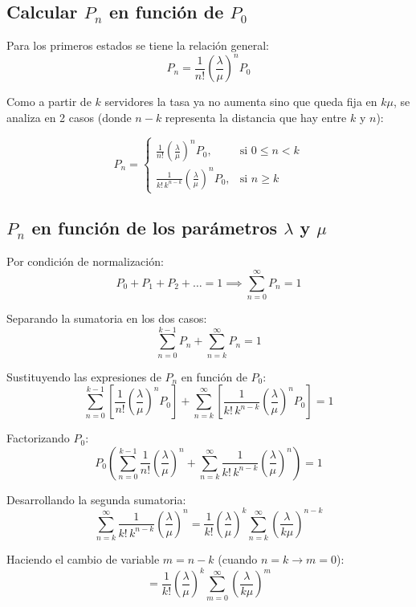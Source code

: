 \documentclass[11pt, a4paper]{article}
\begin{document}
\subsection[Calcular Pn en función de P0]{Calcular $P_n$ en función de $P_0$}

Para los primeros estados se tiene la relación general:
\[
P_n = \frac{1}{n!} \left( \frac{\lambda}{\mu} \right)^n P_0
\]

Como a partir de $k$ servidores la tasa ya no aumenta sino que queda fija en $k\mu$, se analiza en 2 casos (donde $n-k$ representa la distancia que hay entre $k$ y $n$):

\[
P_n = 
\begin{cases} 
\displaystyle \frac{1}{n!} \left( \frac{\lambda}{\mu} \right)^n P_0, & \text{si } 0 \le n < k \\[1.5em]
\displaystyle \frac{1}{k! \, k^{n-k}} \left( \frac{\lambda}{\mu} \right)^n P_0, & \text{si } n \ge k 
\end{cases}
\]

\subsection[Pn en función de los parámetros lambda y mu]{$P_n$ en función de los parámetros $\lambda$ y $\mu$}

Por condición de normalización:
\[
P_0 + P_1 + P_2 + \dots = 1 \implies \sum_{n=0}^{\infty} P_n = 1
\]

Separando la sumatoria en los dos casos:
\[
\sum_{n=0}^{k-1} P_n + \sum_{n=k}^{\infty} P_n = 1
\]

Sustituyendo las expresiones de $P_n$ en función de $P_0$:
\[
\sum_{n=0}^{k-1} \left[ \frac{1}{n!} \left( \frac{\lambda}{\mu} \right)^n P_0 \right] + \sum_{n=k}^{\infty} \left[ \frac{1}{k! \, k^{n-k}} \left( \frac{\lambda}{\mu} \right)^n P_0 \right] = 1
\]

Factorizando $P_0$:
\[
P_0 \left( \sum_{n=0}^{k-1} \frac{1}{n!} \left( \frac{\lambda}{\mu} \right)^n + \sum_{n=k}^{\infty} \frac{1}{k! \, k^{n-k}} \left( \frac{\lambda}{\mu} \right)^n \right) = 1
\]

Desarrollando la segunda sumatoria:
\[
\sum_{n=k}^{\infty} \frac{1}{k! \, k^{n-k}} \left( \frac{\lambda}{\mu} \right)^n = \frac{1}{k!} \left( \frac{\lambda}{\mu} \right)^k \sum_{n=k}^{\infty} \left( \frac{\lambda}{k\mu} \right)^{n-k}
\]

Haciendo el cambio de variable $m = n - k$ (cuando $n = k \to m = 0$):
\[
= \frac{1}{k!} \left( \frac{\lambda}{\mu} \right)^k \sum_{m=0}^{\infty} \left( \frac{\lambda}{k\mu} \right)^m
\]
\end{document}

